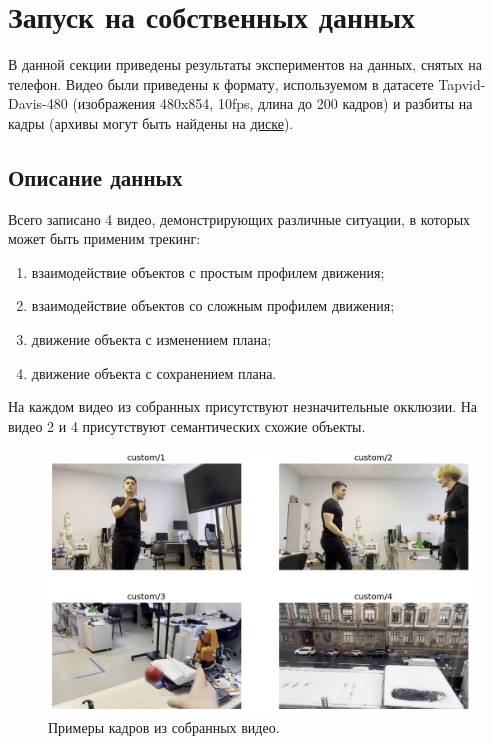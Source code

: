 \documentclass[a4paper, 14pt]{extarticle}
\theoremstyle{definition}
\theoremstyle{plain}
\theoremstyle{remark}
\begin{document}
\section{Запуск на собственных данных}
В данной секции приведены результаты экспериментов на данных, снятых на телефон. Видео были приведены к формату, используемом в датасете Tapvid-Davis-480 (изображения 480x854, 10fps, длина до 200 кадров) и разбиты на кадры (архивы могут быть найдены на \href{https://drive.google.com/drive/folders/1kL4srq3aIuJvA-0jlK886FdR1ZIgu8Ui?usp=drive_link}{диске}). 

\subsection{Описание данных}
Всего записано 4 видео, демонстрирующих различные ситуации, в которых может быть применим трекинг:
\begin{enumerate}
	\item взаимодействие объектов с простым профилем движения;
	\item взаимодействие объектов со сложным профилем движения;
	\item движение объекта с изменением плана;
	\item движение объекта с сохранением плана.
\end{enumerate}

На каждом видео из собранных присутствуют незначительные окклюзии. На видео 2 и 4 присутствуют семантических схожие объекты. 
\begin{figure}
    [H]
    \centering
    \includegraphics[width=\textwidth]{figs/custom_expl.png}
    \caption{Примеры кадров из собранных видео.}
    \label{fig:custom-expl}
\end{figure}
\end{document}
